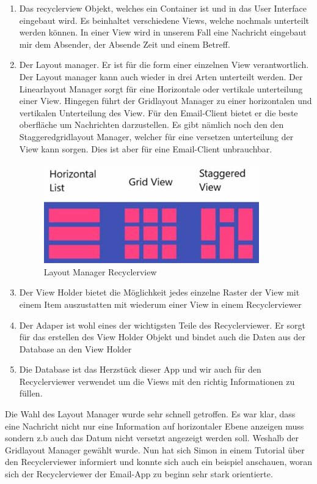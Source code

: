 \documentclass[a4paper,11pt]{article}
\begin{document}
\begin{enumerate}


    \item Das recyclerview Objekt, welches ein Container ist und in das User Interface eingebaut wird. 
Es beinhaltet verschiedene Views, welche nochmals unterteilt werden können. In einer View wird in unserem 
Fall eine Nachricht eingebaut mir dem Absender, der Absende Zeit und einem Betreff. 

    \item Der Layout manager. Er ist für die form einer einzelnen View verantwortlich. 
Der Layout manager kann auch wieder in drei Arten unterteilt werden. Der Linearlayout Manager sorgt für eine 
Horizontale oder vertikale unterteilung einer View. Hingegen führt der Gridlayout Manager zu einer horizontalen 
und vertikalen Unterteilung des View. Für den Email-Client bietet er die  
beste oberfläche um Nachrichten darzustellen. Es gibt nämlich noch den den Staggeredgridlayout Manager, welcher 
für eine versetzen unterteilung der View kann sorgen. Dies ist aber für eine Email-Client unbrauchbar. 

\begin{figure}[H]
    \centering
    \includegraphics[width=.4\textwidth]{media/RecyclerviewLayoutManagerCropt.jpeg}
    \caption{Layout Manager Recyclerview}
\end{figure}

    \item Der View Holder bietet die Möglichkeit jedes einzelne Raster der View mit einem Item auszustatten mit wiederum einer View in einem Recyclerviewer

    \item Der Adaper ist wohl eines der wichtigsten Teile des Recyclerviewer. Er sorgt für das erstellen des View Holder Objekt und
bindet auch die Daten aus der Database an den View Holder

    \item Die Database ist das Herzstück dieser App und wir auch für den Recyclerviewer verwendet um die 
Views mit den richtig Informationen zu füllen. 

\end{enumerate}

Die Wahl des Layout Manager wurde sehr schnell getroffen. Es war klar, dass eine Nachricht nicht nur eine Information auf horizontaler Ebene anzeigen muss sondern
z.b auch das Datum nicht versetzt angezeigt werden soll. Weshalb der Gridlayout Manager gewählt wurde. Nun hat sich Simon in einem Tutorial über den Recyclerviewer informiert
und konnte sich auch ein beispiel anschauen, woran sich der Recyclerviewer der Email-App zu beginn sehr stark orientierte. \\
\end{document}
